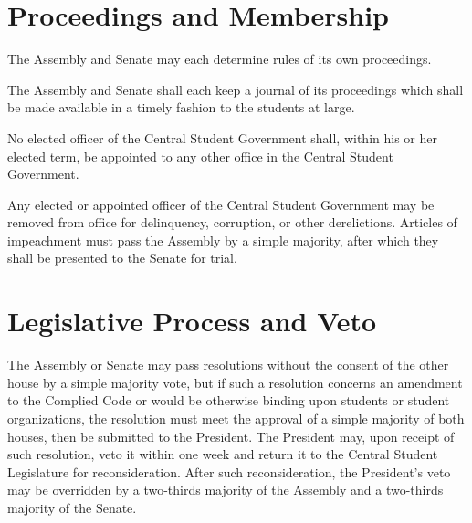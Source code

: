 \section{Proceedings and Membership}
    The Assembly and Senate may each determine rules of its own proceedings.

    The Assembly and Senate shall each keep a journal of its proceedings which shall be made available in a timely fashion to the students at large.

    No elected officer of the Central Student Government shall, within his or her elected term, be appointed to any other office in the Central Student Government.

    Any elected or appointed officer of the Central Student Government may be removed from office for delinquency, corruption, or other derelictions. Articles of impeachment must pass the Assembly by a simple majority, after which they shall be presented to the Senate for trial.  


\section{Legislative Process and Veto}
    The Assembly or Senate may pass resolutions without the consent of the other house by a simple majority vote, but if such a resolution concerns an amendment to the Complied Code or would be otherwise binding upon students or student organizations, the resolution must meet the approval of a simple majority of both houses, then be submitted to the President. The President may, upon receipt of such resolution, veto it within one week and return it to the Central Student Legislature for reconsideration. After such reconsideration, the President's veto may be overridden by a two-thirds majority of the Assembly and a two-thirds majority of the Senate.

